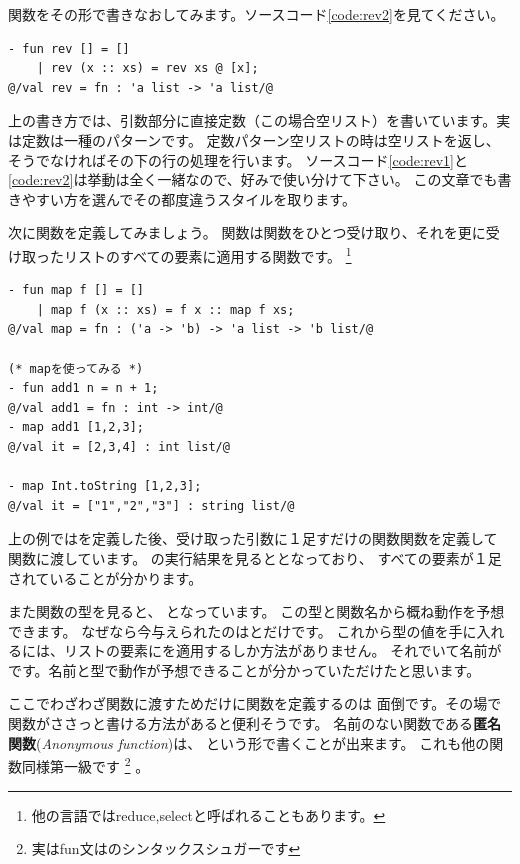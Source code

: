 \documentclass[11pt,a4paper]{article}
\begin{document}
関数をその形で書きなおしてみます。ソースコード\ref{code:rev2}を見てください。

\begin{lstlisting}[caption=引数部分でのパターンマッチ,label=code:rev2]
- fun rev [] = []
    | rev (x :: xs) = rev xs @ [x];
@/val rev = fn : 'a list -> 'a list/@
\end{lstlisting}

上の書き方では、引数部分に直接定数（この場合空リスト）を書いています。実は定数は一種のパターンです。
定数パターン空リストの時は空リストを返し、そうでなければその下の行の処理を行います。
ソースコード\ref{code:rev1}と\ref{code:rev2}は挙動は全く一緒なので、好みで使い分けて下さい。
この文章でも書きやすい方を選んでその都度違うスタイルを取ります。

次に関数を定義してみましょう。
関数は関数をひとつ受け取り、それを更に受け取ったリストのすべての要素に適用する関数です。
\footnote{他の言語ではreduce,selectと呼ばれることもあります。}

\begin{lstlisting}[caption=関数fとリストlを受け取り、lの要素全てにfを適用する関数, label=code:map]
- fun map f [] = []
    | map f (x :: xs) = f x :: map f xs;
@/val map = fn : ('a -> 'b) -> 'a list -> 'b list/@

(* mapを使ってみる *)
- fun add1 n = n + 1;
@/val add1 = fn : int -> int/@
- map add1 [1,2,3];
@/val it = [2,3,4] : int list/@

- map Int.toString [1,2,3];
@/val it = ["1","2","3"] : string list/@
\end{lstlisting}

上の例ではを定義した後、受け取った引数に１足すだけの関数関数を定義して
関数に渡しています。
の実行結果を見ると\prog{[2,3,4]}となっており、
すべての要素が１足されていることが分かります。

また関数の型を見ると、
となっています。
この型と関数名から概ね動作を予想できます。
なぜなら今与えられたのはとだけです。
これから型の値を手に入れるには、リストの要素にを適用するしか方法がありません。
それでいて名前がです。名前と型で動作が予想できることが分かっていただけたと思います。

ここでわざわざ関数に渡すためだけに関数を定義するのは
面倒です。その場で関数がささっと書ける方法があると便利そうです。
名前のない関数である{\bfseries 匿名関数}({\itshape Anonymous function})は、
という形で書くことが出来ます。
これも他の関数同様第一級です
\footnote{実はfun文はのシンタックスシュガーです}
。
\end{document}
